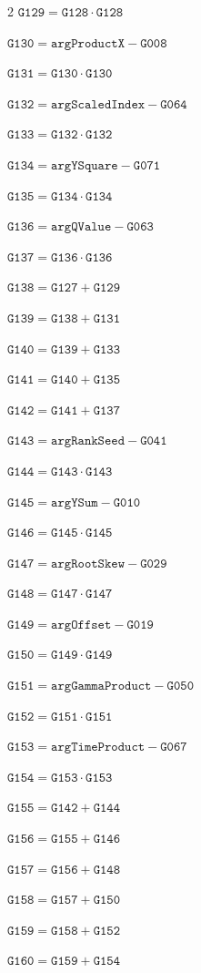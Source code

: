 \documentclass[10pt]{article}
\begin{document}
\begin{multicols}{2}
\noindent $\mathtt{G129}=\mathtt{G128}\cdot \mathtt{G128}$\par
\noindent $\mathtt{G130}=\mathtt{argProductX}-\mathtt{G008}$\par
\noindent $\mathtt{G131}=\mathtt{G130}\cdot \mathtt{G130}$\par
\noindent $\mathtt{G132}=\mathtt{argScaledIndex}-\mathtt{G064}$\par
\noindent $\mathtt{G133}=\mathtt{G132}\cdot \mathtt{G132}$\par
\noindent $\mathtt{G134}=\mathtt{argYSquare}-\mathtt{G071}$\par
\noindent $\mathtt{G135}=\mathtt{G134}\cdot \mathtt{G134}$\par
\noindent $\mathtt{G136}=\mathtt{argQValue}-\mathtt{G063}$\par
\noindent $\mathtt{G137}=\mathtt{G136}\cdot \mathtt{G136}$\par
\noindent $\mathtt{G138}=\mathtt{G127}+\mathtt{G129}$\par
\noindent $\mathtt{G139}=\mathtt{G138}+\mathtt{G131}$\par
\noindent $\mathtt{G140}=\mathtt{G139}+\mathtt{G133}$\par
\noindent $\mathtt{G141}=\mathtt{G140}+\mathtt{G135}$\par
\noindent $\mathtt{G142}=\mathtt{G141}+\mathtt{G137}$\par
\noindent $\mathtt{G143}=\mathtt{argRankSeed}-\mathtt{G041}$\par
\noindent $\mathtt{G144}=\mathtt{G143}\cdot \mathtt{G143}$\par
\noindent $\mathtt{G145}=\mathtt{argYSum}-\mathtt{G010}$\par
\noindent $\mathtt{G146}=\mathtt{G145}\cdot \mathtt{G145}$\par
\noindent $\mathtt{G147}=\mathtt{argRootSkew}-\mathtt{G029}$\par
\noindent $\mathtt{G148}=\mathtt{G147}\cdot \mathtt{G147}$\par
\noindent $\mathtt{G149}=\mathtt{argOffset}-\mathtt{G019}$\par
\noindent $\mathtt{G150}=\mathtt{G149}\cdot \mathtt{G149}$\par
\noindent $\mathtt{G151}=\mathtt{argGammaProduct}-\mathtt{G050}$\par
\noindent $\mathtt{G152}=\mathtt{G151}\cdot \mathtt{G151}$\par
\noindent $\mathtt{G153}=\mathtt{argTimeProduct}-\mathtt{G067}$\par
\noindent $\mathtt{G154}=\mathtt{G153}\cdot \mathtt{G153}$\par
\noindent $\mathtt{G155}=\mathtt{G142}+\mathtt{G144}$\par
\noindent $\mathtt{G156}=\mathtt{G155}+\mathtt{G146}$\par
\noindent $\mathtt{G157}=\mathtt{G156}+\mathtt{G148}$\par
\noindent $\mathtt{G158}=\mathtt{G157}+\mathtt{G150}$\par
\noindent $\mathtt{G159}=\mathtt{G158}+\mathtt{G152}$\par
\noindent $\mathtt{G160}=\mathtt{G159}+\mathtt{G154}$\par
\end{multicols}
\end{document}
